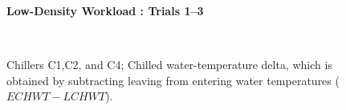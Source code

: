 \documentclass{report}
\begin{document}
\begin{figure}[!h]
\centerline{\bfseries\large Low-Density Workload : Trials 1--3}\\
\caption{Chillers C1,C2, and C4; Chilled water-temperature delta, which is obtained by subtracting leaving from entering water temperatures ($ECHWT-LCHWT$).}
\end{figure}
\end{document}
